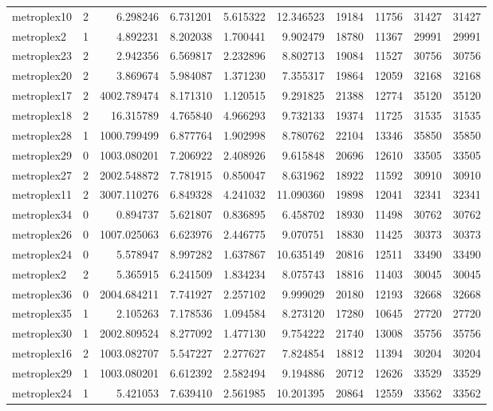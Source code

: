 \begin{longtable}{|l|r|r|r|r|r|r|r|r|r|}
metroplex10 & 2 & 6.298246 & 6.731201 & 5.615322 & 12.346523 & 19184 & 11756 & 31427 & 31427 \\
metroplex2 & 1 & 4.892231 & 8.202038 & 1.700441 & 9.902479 & 18780 & 11367 & 29991 & 29991 \\
metroplex23 & 2 & 2.942356 & 6.569817 & 2.232896 & 8.802713 & 19084 & 11527 & 30756 & 30756 \\
metroplex20 & 2 & 3.869674 & 5.984087 & 1.371230 & 7.355317 & 19864 & 12059 & 32168 & 32168 \\
metroplex17 & 2 & 4002.789474 & 8.171310 & 1.120515 & 9.291825 & 21388 & 12774 & 35120 & 35120 \\
metroplex18 & 2 & 16.315789 & 4.765840 & 4.966293 & 9.732133 & 19374 & 11725 & 31535 & 31535 \\
metroplex28 & 1 & 1000.799499 & 6.877764 & 1.902998 & 8.780762 & 22104 & 13346 & 35850 & 35850 \\
metroplex29 & 0 & 1003.080201 & 7.206922 & 2.408926 & 9.615848 & 20696 & 12610 & 33505 & 33505 \\
metroplex27 & 2 & 2002.548872 & 7.781915 & 0.850047 & 8.631962 & 18922 & 11592 & 30910 & 30910 \\
metroplex11 & 2 & 3007.110276 & 6.849328 & 4.241032 & 11.090360 & 19898 & 12041 & 32341 & 32341 \\
metroplex34 & 0 & 0.894737 & 5.621807 & 0.836895 & 6.458702 & 18930 & 11498 & 30762 & 30762 \\
metroplex26 & 0 & 1007.025063 & 6.623976 & 2.446775 & 9.070751 & 18830 & 11425 & 30373 & 30373 \\
metroplex24 & 0 & 5.578947 & 8.997282 & 1.637867 & 10.635149 & 20816 & 12511 & 33490 & 33490 \\
metroplex2 & 2 & 5.365915 & 6.241509 & 1.834234 & 8.075743 & 18816 & 11403 & 30045 & 30045 \\
metroplex36 & 0 & 2004.684211 & 7.741927 & 2.257102 & 9.999029 & 20180 & 12193 & 32668 & 32668 \\
metroplex35 & 1 & 2.105263 & 7.178536 & 1.094584 & 8.273120 & 17280 & 10645 & 27720 & 27720 \\
metroplex30 & 1 & 2002.809524 & 8.277092 & 1.477130 & 9.754222 & 21740 & 13008 & 35756 & 35756 \\
metroplex16 & 2 & 1003.082707 & 5.547227 & 2.277627 & 7.824854 & 18812 & 11394 & 30204 & 30204 \\
metroplex29 & 1 & 1003.080201 & 6.612392 & 2.582494 & 9.194886 & 20712 & 12626 & 33529 & 33529 \\
metroplex24 & 1 & 5.421053 & 7.639410 & 2.561985 & 10.201395 & 20864 & 12559 & 33562 & 33562 \\

\end{longtable}
